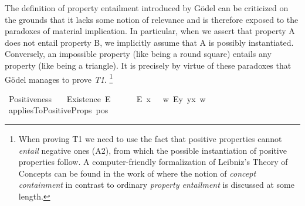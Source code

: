 \begin{isabellebody}
%
%
%
%
\begin{isamarkuptext}%
The definition of property entailment introduced by G\"odel can be criticized on the grounds that it lacks
 some notion of relevance and is therefore exposed to the paradoxes of material implication.
 In particular, when we assert that property A does not entail property B, we implicitly assume that
 A is possibly instantiated. Conversely, an impossible property (like being a round square) entails any property
 (like being a triangle). It is precisely by virtue of these paradoxes that G\"odel manages to prove \emph{T1}.
 \footnote{When proving T1 we need to use the fact that positive properties cannot \emph{entail} negative ones (A2), 
 from which the possible instantiation of positive properties follow. 
 A computer-friendly formalization of Leibniz's Theory of Concepts can be found in the work of \cite{Zalta_Leibniz}
 where the notion of \emph{concept containment} in contrast to ordinary \emph{property entailment} is discussed at some length.}%
\end{isamarkuptext}\isamarkuptrue%
\isamarkupfalse%
\ Positiveness{\isacharcolon}{\isacharcolon}{\isachardoublequoteopen}{\isasymup}{\isasymlangle}{\isasymup}{\isasymlangle}{\isasymzero}{\isasymrangle}{\isasymrangle}{\isachardoublequoteclose}\ {\isacharparenleft}{\isachardoublequoteopen}{\isasymP}{\isachardoublequoteclose}{\isacharparenright}\ %
\isanewline
{}\isamarkupfalse%
\ Existence{\isacharcolon}{\isacharcolon}{\isachardoublequoteopen}{\isasymup}{\isasymlangle}{\isasymzero}{\isasymrangle}{\isachardoublequoteclose}\ {\isacharparenleft}{\isachardoublequoteopen}E{\isacharbang}{\isachardoublequoteclose}{\isacharparenright}\ %
\ \isanewline
\ \ \ {\isachardoublequoteopen}E{\isacharbang}\ x\ \ {\isasymequiv}\ {\isasymlambda}w{\isachardot}\ {\isacharparenleft}\isactrlbold {\isasymexists}\isactrlsup Ey{\isachardot}\ y\isactrlbold {\isasymapprox}x{\isacharparenright}\ w{\isachardoublequoteclose}\ \isanewline
{}\isamarkupfalse%
\ appliesToPositiveProps{\isacharcolon}{\isacharcolon}{\isachardoublequoteopen}{\isasymup}{\isasymlangle}{\isasymup}{\isasymlangle}{\isasymup}{\isasymlangle}{\isasymzero}{\isasymrangle}{\isasymrangle}{\isasymrangle}{\isachardoublequoteclose}\ {\isacharparenleft}{\isachardoublequoteopen}pos{\isachardoublequoteclose}{\isacharparenright}\ \isanewline

\end{isabellebody}
